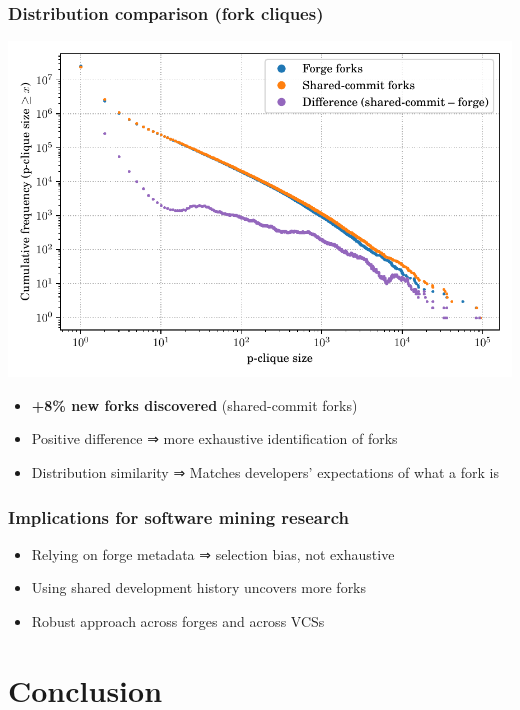 \documentclass[aspectratio=169,xcolor=table]{beamer}
\begin{document}
    \begin{frame}
        \frametitle{Distribution comparison (fork cliques)}
        \begin{center}
            \includegraphics[width=0.5\linewidth]{../img/forks/fork-clique-partition-freq-distribution.pdf}
        \end{center}
        \begin{block}{}
            \begin{itemize}
                \item \textbf{+8\% new forks discovered} (shared-commit forks)
                \item Positive difference ⇒ more exhaustive identification of
                    forks
                \item Distribution similarity ⇒ Matches developers'
                    expectations of what a fork is
            \end{itemize}
        \end{block}
    \end{frame}

    \begin{frame}
        \frametitle{Implications for software mining research}

        \begin{block}{}
            \begin{itemize}
                \item Relying on forge metadata ⇒ selection bias, not
                    exhaustive
                \item Using shared development history uncovers more forks
                \item Robust approach across forges and across VCSs
            \end{itemize}
        \end{block}

    \end{frame}

    \section{Conclusion}
\end{document}
